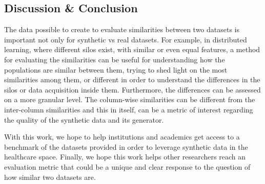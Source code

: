 \subsection{Discussion \& Conclusion}

The data possible to create to evaluate similarities between two datasets is important not only for synthetic vs real datasets. For example, in distributed learning, where different silos exist, with similar or even equal features, a method for evaluating the similarities can be useful for understanding how the populations are similar between them, trying to shed light on the most similarities among them, or different in order to understand the differences in the silos or data acquisition inside them.
Furthermore, the differences can be assessed on a more granular level. The column-wise similarities can be different from the inter-column similarities and this in itself, can be a metric of interest regarding the quality of the synthetic data and its generator.

With this work, we hope to help institutions and academics get access to a benchmark of the datasets provided in order to leverage synthetic data in the healthcare space. Finally, we hope this work helps other researchers reach an evaluation metric that could be a unique and clear response to the question of how similar two datasets are.
